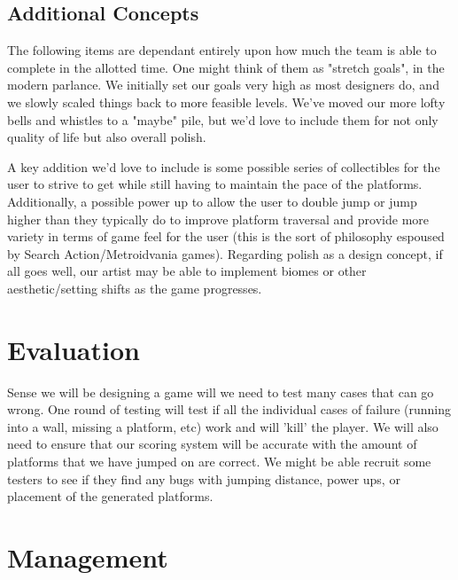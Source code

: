 \documentclass{article}
\begin{document}
\subsection{Additional Concepts}
The following items are dependant entirely upon how much the team is able to complete in the allotted time. One might think of them as "stretch goals", in the modern parlance. We initially set our goals very high as most designers do, and we slowly scaled things back to more feasible levels. We've moved our more lofty bells and whistles to a "maybe" pile, but we'd love to include them for not only quality of life but also overall polish. \hfill \break

A key addition we'd love to include is some possible series of collectibles for the user to strive to get while still having to maintain the pace of the platforms. Additionally, a possible power up to allow the user to double jump or jump higher than they typically do to improve platform traversal and provide more variety in terms of game feel for the user (this is the sort of philosophy espoused by Search Action/Metroidvania games). Regarding polish as a design concept, if all goes well, our artist may be able to implement biomes or other aesthetic/setting shifts as the game progresses.\hfill \break
\section{Evaluation}
Sense we will be designing a game will we need to test many cases that can go wrong. One round of testing will test if all the individual cases of failure (running into a wall, missing a platform, etc) work and will 'kill' the player. We will also need to ensure that our scoring system will be accurate with the amount of platforms that we have jumped on are correct. We might be able recruit some testers to see if they find any bugs with jumping distance, power ups, or placement of the generated platforms.
\section{Management}
\end{document}
